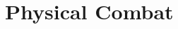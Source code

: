 \chapter{Physical Combat}
\label{ch:physical-combat}
\setlength{\columnsep}{\defcolwidth}\begin{multicols*}{2}
\end{multicols*}